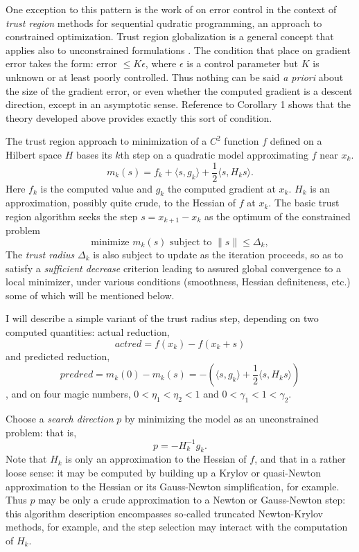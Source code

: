 One exception to this pattern is the work of \cite{HeinkenVicente:01b,DPKouri_MHeinkenschloss_DRidzal_BGvanBloemenWaanders_2013a,DPKouri_MHeinkenschloss_DRidzal_BGvanBloemenWaanders_2014a}
on error control in the context of {\em trust region} methods for
sequential qudratic programming, an approach to constrained
optimization. Trust region globalization is a general concept that
applies also to unconstrained formulations
\cite[]{ConnGouldToint:00,NocedalWright}. The condition that
\cite{HeinkenVicente:01b} place on gradient error takes the form:
error $\le K \epsilon$, where $\epsilon$ is a control parameter but
$K$ is unknown or at least poorly controlled. Thus nothing can be said
{\em a priori} about the size of the gradient error, or even whether
the computed gradient is a descent direction, except in an asymptotic
sense. Reference to Corollary 1 shows that the theory developed above
provides exactly this sort of condition.

The trust region approach to minimization of a $C^2$ function $f$
defined on a Hilbert space $H$ bases its $k$th step on a quadratic model
approximating $f$ near $x_k$.
\[
m_k(s) = f_k + \langle s,g_k \rangle + \frac{1}{2}\langle s,H_k s
\rangle.
\]
Here $f_k$ is the computed value and $g_k$ the computed gradient at
$x_k$. $H_k$ is an approximation, possibly quite crude, to the Hessian
of $f$ at $x_k$. The basic trust region algorithm seeks the step $s=x_{k+1}-x_k$
as the optimum of the constrained problem
\begin{equation}
\label{eqn:trustregion}
\mbox{minimize }m_k(s) \mbox{ subject to } \|s\| \le \Delta_k,
\end{equation}
The {\em trust radius} $\Delta_k$ is also subject to update as the iteration
proceeds, so as to satisfy a {\em sufficient decrease} criterion
leading to assured global convergence to a local minimizer, under
various conditions (smoothness, Hessian definiteness, etc.) some of
which will be mentioned below.

I will describe a simple variant of the trust radius step, depending
on two computed quantities: actual reduction,
\[
actred = f(x_k) - f(x_k +s)
\]
and predicted reduction, 
\[
predred = m_k(0) - m_k(s) = -(\langle s,g_k \rangle +
\frac{1}{2}\langle s, H_k s \rangle)
\],
and on four magic numbers, $0 < \eta_1 <\eta_2 < 1$ and 
$0 < \gamma_1 <1 < \gamma_2 $. 

Choose a {\em search direction} $p$ by
minimizing the model as an unconstrained problem: that is,
\[
p = -H_k^{-1}g_k.
\]
Note that $H_k$ is only an approximation to the Hessian of $f$, and
that in a rather loose sense: it may be computed by building up a
Krylov or quasi-Newton approximation to the Hessian or its
Gauss-Newton simplification, for example. Thus $p$ may be only a crude
approximation to a Newton or Gauss-Newton step: this algorithm
description encompasses so-called truncated Newton-Krylov methods, for
example, and the step selection may interact with the computation of
$H_k$.

